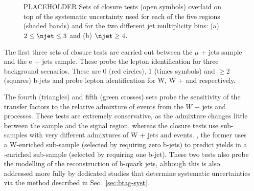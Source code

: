 \begin{figure}[h!]
  \begin{center}
     \\
     \\
    \caption{PLACEHOLDER Sets of closure tests (open symbols) overlaid on top of
      the systematic uncertainty used for each of the five \scalht
      regions (shaded bands) and for the two different jet
      multiplicity bins: (a) $2 \leq \njet \leq 3$ and (b) $\njet \geq
      4$.  }
    \label{fig:closure}
  \end{center} 
\end{figure}

The first three sets of closure tests are carried out between the $\mu$ 
+ jets sample and the e + jets sample. These probe the lepton 
identification for three background scenarios. These are 0 (red circles), 
1 (times symbols) and $\ge2$ (squares) b-jets and probe lepton identification 
for W, W + \ttbar and \ttbar respectively.

The fourth (triangles) and fifth (green crosses) sets probe the
sensitivity of the transfer factors to the relative admixture of
events from the $W$ + jets and \ttbar processes. These tests are
extremely conservative, as the admixture changes little between the
\mj sample and the signal region, whereas the closure tests use
sub-samples with very different admixtures of W + jets and \ttbar
events. \eg, the former uses a W-enriched sub-sample (selected by
requiring zero b-jets) to predict yields in a \ttbar-enriched
sub-sample (selected by requiring one b-jet). These two tests also
probe the modelling of the reconstruction of b-quark jets, although
this is also addressed more fully by dedicated studies that determine
systematic uncertainties via the method described in
Sec.~\ref{sec:btag-syst}.

